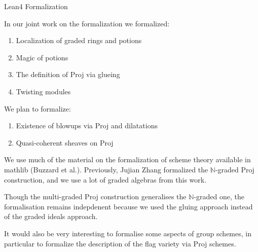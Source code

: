 \documentclass[9pt]{beamer}
\begin{document}
\begin{frame}{Lean4 Formalization}

In our joint work on the formalization we formalized: 
\begin{enumerate}
\item Localization of graded rings and potions

\item Magic of potions 

\item The definition of Proj via glueing 

\item Twisting modules
\end{enumerate}
We plan to formalize:

\begin{enumerate} \item Existence of blowups via Proj and dilatations 
\item Quasi-coherent sheaves on Proj
\end{enumerate}



We use much of the material on the formalization of scheme theory available in mathlib (Buzzard et al.).
Previously, Jujian Zhang formalized the $\mathbb{N}$-graded $\mathrm{Proj}$ construction, and we use a lot of graded algebras from this work. 



 Though the multi-graded Proj construction generalises the $\mathbb{N}$-graded one, the formalisation remains indepdenent because we used the gluing approach instead of the graded ideals approach. 

 It would also be very interesting to formalise some aspects of group schemes, in particular to formalize the description of the flag variety via Proj schemes.

\end{frame}
\end{document}
